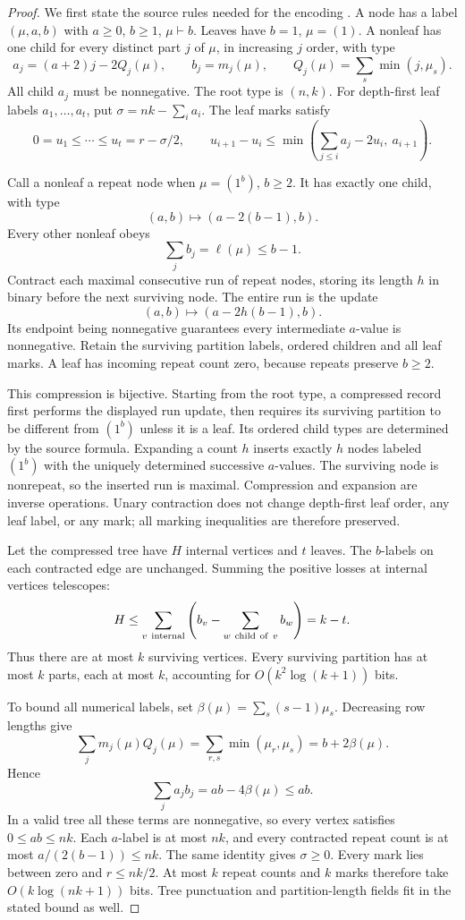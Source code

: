 \begin{proof}
We first state the source rules needed for the encoding
\cite[Definition~3.2, p.~6; Definition~4.4, p.~10]{PPS}.
A node has a label $(\mu,a,b)$ with $a\ge0$, $b\ge1$, $\mu\vdash b$.
Leaves have $b=1$, $\mu=(1)$. A nonleaf has one child for every
distinct part $j$ of $\mu$, in increasing $j$ order, with type
\[
 a_j=(a+2)j-2Q_j(\mu),\qquad b_j=m_j(\mu),\qquad
 Q_j(\mu)=\sum_s\min(j,\mu_s).
\]
All child $a_j$ must be nonnegative. The root type is $(n,k)$.
For depth-first leaf labels $a_1,\ldots,a_t$, put
$\sigma=nk-\sum_i a_i$. The leaf marks satisfy
\[
 0=u_1\le\cdots\le u_t=r-\sigma/2,\qquad
 u_{i+1}-u_i\le
 \min\left(\sum_{j\le i}a_j-2u_i,\ a_{i+1}\right).
\]

Call a nonleaf a repeat node when $\mu=(1^b)$, $b\ge2$.
It has exactly one child, with type
\[
 (a,b)\longmapsto(a-2(b-1),b).
\]
Every other nonleaf obeys
\[
 \sum_j b_j=\ell(\mu)\le b-1.
\]
Contract each maximal consecutive run of repeat nodes, storing its
length $h$ in binary before the next surviving node. The entire run
is the update
\[
 (a,b)\longmapsto(a-2h(b-1),b).
\]
Its endpoint being nonnegative guarantees every intermediate
$a$-value is nonnegative. Retain the surviving partition labels,
ordered children and all leaf marks. A leaf has incoming repeat
count zero, because repeats preserve $b\ge2$.

This compression is bijective. Starting from the root type, a
compressed record first performs the displayed run update, then
requires its surviving partition to be different from $(1^b)$
unless it is a leaf. Its ordered child types are determined by the
source formula. Expanding a count $h$ inserts exactly $h$ nodes
labeled $(1^b)$ with the uniquely determined successive $a$-values.
The surviving node is nonrepeat, so the inserted run is maximal.
Compression and expansion are inverse operations. Unary contraction
does not change depth-first leaf order, any leaf label, or any mark;
all marking inequalities are therefore preserved.

Let the compressed tree have $H$ internal vertices and $t$ leaves.
The $b$-labels on each contracted edge are unchanged. Summing the
positive losses at internal vertices telescopes:
\[
 H\le
 \sum_{v\ {\rm internal}}
       \left(b_v-\sum_{w\ {\rm child\ of}\ v}b_w\right)
 =k-t.
\]
Thus there are at most $k$ surviving vertices. Every surviving
partition has at most $k$ parts, each at most $k$, accounting for
$O(k^2\log(k+1))$ bits.

To bound all numerical labels, set
$\beta(\mu)=\sum_s(s-1)\mu_s$. Decreasing row lengths give
\[
 \sum_jm_j(\mu)Q_j(\mu)
 =\sum_{r,s}\min(\mu_r,\mu_s)
 =b+2\beta(\mu).
\]
Hence
\[
 \sum_j a_jb_j=ab-4\beta(\mu)\le ab.
\]
In a valid tree all these terms are nonnegative, so every vertex
satisfies $0\le ab\le nk$. Each $a$-label is at most $nk$, and
every contracted repeat count is at most $a/(2(b-1))\le nk$.
The same identity gives $\sigma\ge0$. Every mark lies between
zero and $r\le nk/2$. At most $k$ repeat counts and $k$ marks
therefore take $O(k\log(nk+1))$ bits. Tree punctuation and
partition-length fields fit in the stated bound as well.


\end{proof}
